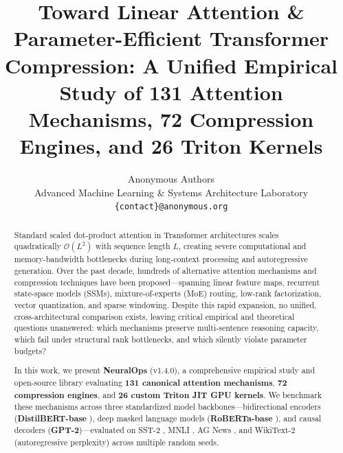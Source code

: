 \documentclass{article}
\title{Toward Linear Attention \& Parameter-Efficient Transformer Compression: A Unified Empirical Study of 131 Attention Mechanisms, 72 Compression Engines, and 26 Triton Kernels}
\author{Anonymous Authors \\
Advanced Machine Learning \& Systems Architecture Laboratory \\
\texttt{\{contact\}@anonymous.org}
}
\begin{document}
\maketitle

\begin{abstract}
Standard scaled dot-product attention in Transformer architectures scales quadratically $\mathcal{O}(L^2)$ with sequence length $L$, creating severe computational and memory-bandwidth bottlenecks during long-context processing and autoregressive generation. Over the past decade, hundreds of alternative attention mechanisms and compression techniques have been proposed---spanning linear feature maps, recurrent state-space models (SSMs), mixture-of-experts (MoE) routing, low-rank factorization, vector quantization, and sparse windowing. Despite this rapid expansion, no unified, cross-architectural comparison exists, leaving critical empirical and theoretical questions unanswered: which mechanisms preserve multi-sentence reasoning capacity, which fail under structural rank bottlenecks, and which silently violate parameter budgets?

In this work, we present \textbf{NeuralOps} (v1.4.0), a comprehensive empirical study and open-source library evaluating \textbf{131 canonical attention mechanisms}, \textbf{72 compression engines}, and \textbf{26 custom Triton JIT GPU kernels}. We benchmark these mechanisms across three standardized model backbones---bidirectional encoders (\textbf{DistilBERT-base} \citep{sanh2019distilbert}), deep masked language models (\textbf{RoBERTa-base} \citep{liu2019roberta}), and causal decoders (\textbf{GPT-2})---evaluated on SST-2 \citep{socher2013recursive}, MNLI \citep{williams2018broad}, AG News \citep{zhang2015character}, and WikiText-2 (autoregressive perplexity) across multiple random seeds.


\end{abstract}
\end{document}
